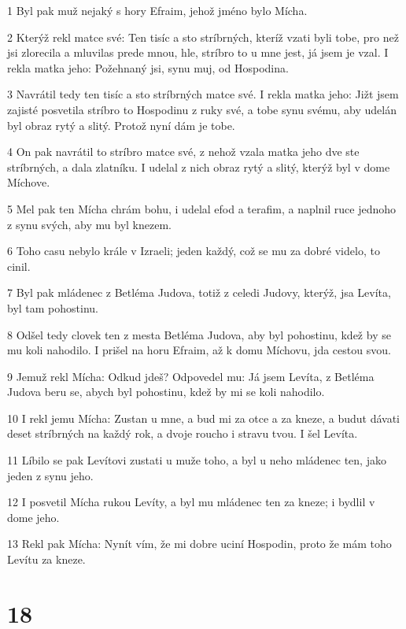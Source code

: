 \par 1 Byl pak muž nejaký s hory Efraim, jehož jméno bylo Mícha.
\par 2 Kterýž rekl matce své: Ten tisíc a sto stríbrných, kteríž vzati byli tobe, pro než jsi zlorecila a mluvilas prede mnou, hle, stríbro to u mne jest, já jsem je vzal. I rekla matka jeho: Požehnaný jsi, synu muj, od Hospodina.
\par 3 Navrátil tedy ten tisíc a sto stríbrných matce své. I rekla matka jeho: Jižt jsem zajisté posvetila stríbro to Hospodinu z ruky své, a tobe synu svému, aby udelán byl obraz rytý a slitý. Protož nyní dám je tobe.
\par 4 On pak navrátil to stríbro matce své, z nehož vzala matka jeho dve ste stríbrných, a dala zlatníku. I udelal z nich obraz rytý a slitý, kterýž byl v dome Míchove.
\par 5 Mel pak ten Mícha chrám bohu, i udelal efod a terafim, a naplnil ruce jednoho z synu svých, aby mu byl knezem.
\par 6 Toho casu nebylo krále v Izraeli; jeden každý, což se mu za dobré videlo, to cinil.
\par 7 Byl pak mládenec z Betléma Judova, totiž z celedi Judovy, kterýž, jsa Levíta, byl tam pohostinu.
\par 8 Odšel tedy clovek ten z mesta Betléma Judova, aby byl pohostinu, kdež by se mu koli nahodilo. I prišel na horu Efraim, až k domu Míchovu, jda cestou svou.
\par 9 Jemuž rekl Mícha: Odkud jdeš? Odpovedel mu: Já jsem Levíta, z Betléma Judova beru se, abych byl pohostinu, kdež by mi se koli nahodilo.
\par 10 I rekl jemu Mícha: Zustan u mne, a bud mi za otce a za kneze, a budut dávati deset stríbrných na každý rok, a dvoje roucho i stravu tvou. I šel Levíta.
\par 11 Líbilo se pak Levítovi zustati u muže toho, a byl u neho mládenec ten, jako jeden z synu jeho.
\par 12 I posvetil Mícha rukou Levíty, a byl mu mládenec ten za kneze; i bydlil v dome jeho.
\par 13 Rekl pak Mícha: Nynít vím, že mi dobre uciní Hospodin, proto že mám toho Levítu za kneze.

\chapter{18}

